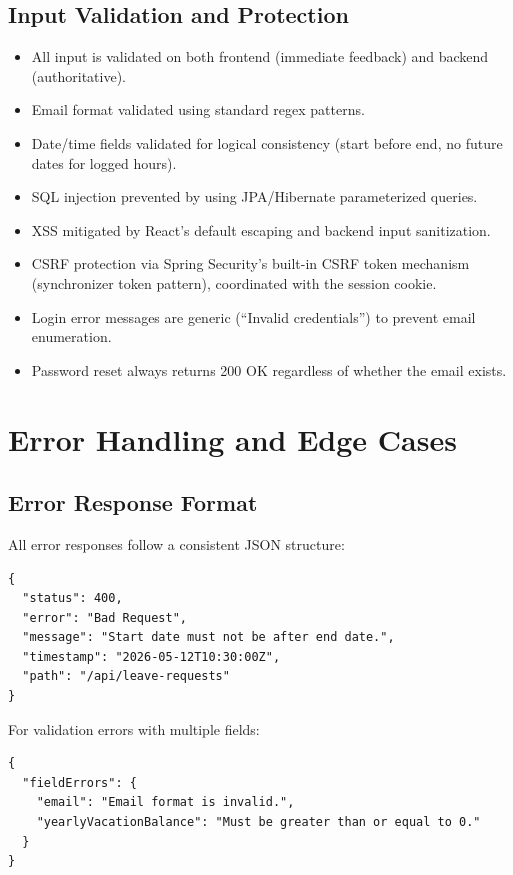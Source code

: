 \documentclass[11pt,a4paper]{article}
\begin{document}
\subsection{Input Validation and Protection}

\begin{itemize}[leftmargin=1.5em]
    \item All input is validated on both frontend (immediate feedback) and backend (authoritative).
    \item Email format validated using standard regex patterns.
    \item Date/time fields validated for logical consistency (start before end, no future dates for logged hours).
    \item SQL injection prevented by using JPA/Hibernate parameterized queries.
    \item XSS mitigated by React's default escaping and backend input sanitization.
    \item CSRF protection via Spring Security's built-in CSRF token mechanism (synchronizer token pattern), coordinated with the session cookie.
    \item Login error messages are generic (``Invalid credentials'') to prevent email enumeration.
    \item Password reset always returns 200 OK regardless of whether the email exists.
\end{itemize}

\section{Error Handling and Edge Cases}
\label{sec:errors}

\subsection{Error Response Format}

All error responses follow a consistent JSON structure:

\begin{lstlisting}[style=json]
{
  "status": 400,
  "error": "Bad Request",
  "message": "Start date must not be after end date.",
  "timestamp": "2026-05-12T10:30:00Z",
  "path": "/api/leave-requests"
}
\end{lstlisting}

For validation errors with multiple fields:

\begin{lstlisting}[style=json]
{
  "fieldErrors": {
    "email": "Email format is invalid.",
    "yearlyVacationBalance": "Must be greater than or equal to 0."
  }
}
\end{lstlisting}
\end{document}
